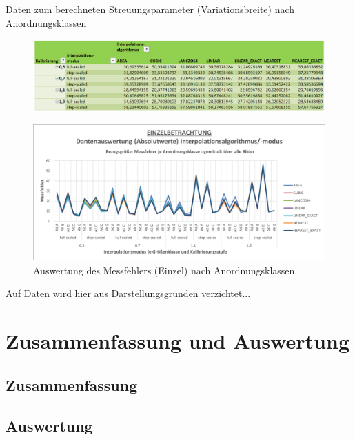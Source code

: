 \documentclass[
fontsize=10pt, 
listof = totoc,
parskip = half	
]{report}
\begin{document}
\begin{table}[H]
	\caption{Daten zum berechneten Streuungsparameter (Variationsbreite) nach Anordnungsklassen}
	\begin{figure}[H]
		\centering
		\includegraphics[width=\textwidth, height=\textheight, keepaspectratio]{pics/Tab_DA_Gesamt_Streu2_AKL}
		\label{tab:DAGesamtStreu2GAKL}
	\end{figure}
\end{table}

\begin{figure}[H]
	\centering
	\includegraphics[width=14cm, height=\textheight, keepaspectratio]{pics/DA_Einzel_Absolut_AKL}
	\caption{Auswertung des Messfehlers (Einzel) nach Anordnungsklassen}
	\label{fig:DAEinzelAbsolutAKL}
\end{figure}

Auf Daten wird hier aus Darstellungsgründen verzichtet...

\chapter{Zusammenfassung und Auswertung}

\section{Zusammenfassung}

\section{Auswertung}




\end{document}
